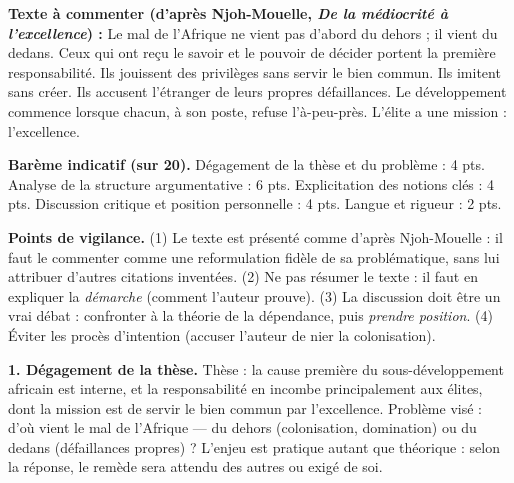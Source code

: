 \documentclass[11pt]{article}
\begin{document}
\begin{corrige}

\textbf{Texte à commenter (d'après Njoh-Mouelle, \emph{De la médiocrité à l'excellence}) :}
\guillemotleft Le mal de l'Afrique ne vient pas d'abord du dehors ; il vient du dedans. Ceux qui ont reçu le savoir et le pouvoir de décider portent la première responsabilité. Ils jouissent des privilèges sans servir le bien commun. Ils imitent sans créer. Ils accusent l'étranger de leurs propres défaillances. Le développement commence lorsque chacun, à son poste, refuse l'à-peu-près. L'élite a une mission : l'excellence. \guillemotright

\tcblower

\textbf{Barème indicatif (sur 20).} Dégagement de la thèse et du problème : 4 pts. Analyse de la structure argumentative : 6 pts. Explicitation des notions clés : 4 pts. Discussion critique et position personnelle : 4 pts. Langue et rigueur : 2 pts.

\textbf{Points de vigilance.} (1) Le texte est présenté comme \guillemotleft d'après \guillemotright Njoh-Mouelle : il faut le commenter comme une reformulation fidèle de sa problématique, sans lui attribuer d'autres citations inventées. (2) Ne pas résumer le texte : il faut en expliquer la \emph{démarche} (comment l'auteur prouve). (3) La discussion doit être un vrai débat : confronter à la théorie de la dépendance, puis \emph{prendre position}. (4) Éviter les procès d'intention (accuser l'auteur de nier la colonisation).

\textbf{1. Dégagement de la thèse.} Thèse : la cause première du sous-développement africain est interne, et la responsabilité en incombe principalement aux élites, dont la mission est de servir le bien commun par l'excellence. Problème visé : d'où vient le \guillemotleft mal \guillemotright de l'Afrique — du dehors (colonisation, domination) ou du dedans (défaillances propres) ? L'enjeu est pratique autant que théorique : selon la réponse, le remède sera attendu des autres ou exigé de soi.


\end{corrige}
\end{document}
